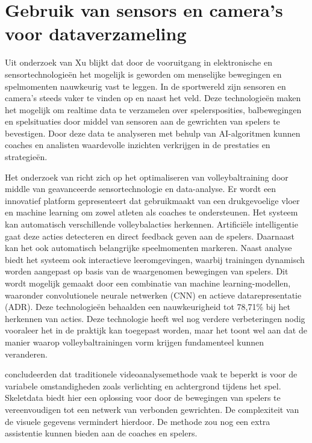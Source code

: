 \section{Gebruik van sensors en camera's voor dataverzameling}
Uit onderzoek van Xu \textcite{Sun2021} blijkt dat door de vooruitgang in elektronische en sensortechnologieën het mogelijk is geworden om menselijke bewegingen en spelmomenten nauwkeurig vast te leggen. In de sportwereld zijn sensoren en camera's steeds vaker te vinden op en naast het veld. Deze technologieën maken het mogelijk om realtime data te verzamelen over spelersposities, balbewegingen en spelsituaties door middel van sensoren aan de gewrichten van spelers te bevestigen. Door deze data te analyseren met behulp van AI-algoritmen kunnen coaches en analisten waardevolle inzichten verkrijgen in de prestaties en strategieën.

Het onderzoek van \textcite{Salim2024} richt zich op het optimaliseren van volleybaltraining door middle van geavanceerde sensortechnologie en data-analyse. Er wordt een innovatief platform gepresenteert dat gebruikmaakt van een drukgevoelige vloer en machine learning om zowel atleten als coaches te ondersteunen. Het systeem kan automatisch verschillende volleybalacties herkennen. Artificiële intelligentie gaat deze acties detecteren en direct feedback geven aan de spelers. Daarnaast kan het ook automatisch belangrijke speelmomenten markeren.
Naast analyse biedt het systeem ook interactieve leeromgevingen, waarbij trainingen dynamisch worden aangepast op basis van de waargenomen bewegingen van spelers. Dit wordt mogelijk gemaakt door een combinatie van machine learning-modellen, waaronder convolutionele neurale netwerken (CNN) en actieve datarepresentatie (ADR). Deze technologieën behaalden een nauwkeurigheid tot 78,71\% bij het herkennen van acties.
Deze technologie heeft wel nog verdere verbeteringen nodig vooraleer het in de praktijk kan toegepast worden, maar het toont wel aan dat de manier waarop volleybaltrainingen vorm krijgen fundamenteel kunnen veranderen.

\textcite{Liang2023} concludeerden dat traditionele videoanalysemethode vaak te beperkt is voor de variabele omstandigheden zoals verlichting en achtergrond tijdens het spel. Skeletdata biedt hier een oplossing voor door de bewegingen van spelers te vereenvoudigen tot een netwerk van verbonden gewrichten. De complexiteit van de visuele gegevens vermindert hierdoor. De methode zou nog een extra assistentie kunnen bieden aan de coaches en spelers.

